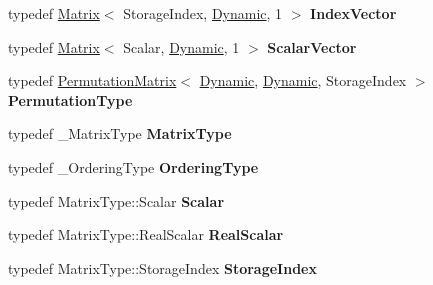 \begin{DoxyCompactItemize}
\item 
\mbox{\label{group___sparse_q_r___module_ac9b87ec35a55751c2c439265b22d5931}} 
typedef \hyperlink{group___core___module_class_eigen_1_1_matrix}{Matrix}$<$ Storage\+Index, \hyperlink{namespace_eigen_ad81fa7195215a0ce30017dfac309f0b2}{Dynamic}, 1 $>$ {\bfseries Index\+Vector}
\item 
\mbox{\label{group___sparse_q_r___module_a97c9c4b7cf2b31182acf410253682f07}} 
typedef \hyperlink{group___core___module_class_eigen_1_1_matrix}{Matrix}$<$ Scalar, \hyperlink{namespace_eigen_ad81fa7195215a0ce30017dfac309f0b2}{Dynamic}, 1 $>$ {\bfseries Scalar\+Vector}
\item 
\mbox{\label{group___sparse_q_r___module_a7cddb16fd69b520c7881288d5d7cf7c6}} 
typedef \hyperlink{group___core___module_class_eigen_1_1_permutation_matrix}{Permutation\+Matrix}$<$ \hyperlink{namespace_eigen_ad81fa7195215a0ce30017dfac309f0b2}{Dynamic}, \hyperlink{namespace_eigen_ad81fa7195215a0ce30017dfac309f0b2}{Dynamic}, Storage\+Index $>$ {\bfseries Permutation\+Type}
\item 
\mbox{\label{group___sparse_q_r___module_ad358268460ec00e9cd058846a2cbb6f5}} 
typedef \+\_\+\+Matrix\+Type {\bfseries Matrix\+Type}
\item 
\mbox{\label{group___sparse_q_r___module_a6b2f072bb9206c83f6046f25fcc4dbbe}} 
typedef \+\_\+\+Ordering\+Type {\bfseries Ordering\+Type}
\item 
\mbox{\label{group___sparse_q_r___module_a1b368cb269850c36954d938a9e216ee9}} 
typedef Matrix\+Type\+::\+Scalar {\bfseries Scalar}
\item 
\mbox{\label{group___sparse_q_r___module_a30621d97daf0e3ef2337b7c37cb8f3d9}} 
typedef Matrix\+Type\+::\+Real\+Scalar {\bfseries Real\+Scalar}
\item 
\mbox{\label{group___sparse_q_r___module_a2e4bf46ef8f961837762d60860748938}} 
typedef Matrix\+Type\+::\+Storage\+Index {\bfseries Storage\+Index}
\item 

\end{DoxyCompactItemize}
